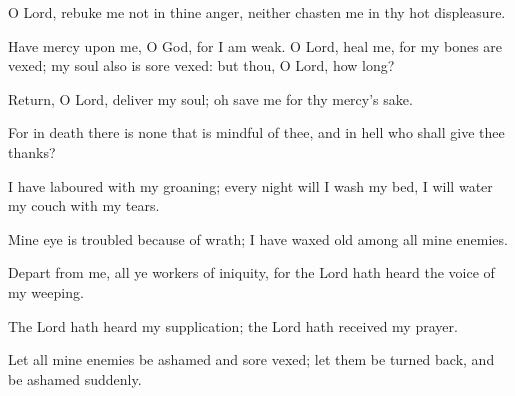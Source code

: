 O Lord, rebuke me not in thine anger, neither chasten me in thy hot displeasure.

Have mercy upon me, O God, for I am weak. O Lord, heal me, for my bones are vexed; my soul also is sore vexed: but thou, O Lord, how long?

Return, O Lord, deliver my soul; oh save me for thy mercy's sake.

For in death there is none that is mindful of thee, and in hell who shall give thee thanks?

I have laboured with my groaning; every night will I wash my bed, I will water my couch with my tears.

Mine eye is troubled because of wrath; I have waxed old
among all mine enemies.

Depart from me, all ye workers of iniquity, for the Lord hath heard the voice of my weeping.

The Lord hath heard my supplication; the Lord hath received my prayer.

Let all mine enemies be ashamed and sore vexed; let them be turned back, and be ashamed suddenly.
